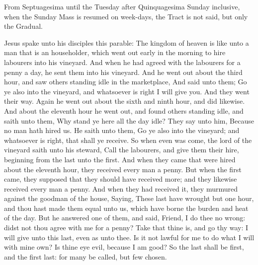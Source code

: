 \begin{rubric}
    From Septuagesima until the Tuesday after Quinquagesima Sunday inclusive, when the Sunday Mass is resumed on week-days, the Tract is not said, but only the Gradual.
\end{rubric}


 Jesus spake unto his disciples this parable: The kingdom of heaven is like unto a man that is an householder, which went out early in the morning to hire labourers into his vineyard. And when he had agreed with the labourers for a penny a day, he sent them into his vineyard. And he went out about the third hour, and saw others standing idle in the marketplace, And said unto them; Go ye also into the vineyard, and whatsoever is right I will give you. And they went their way. Again he went out about the sixth and ninth hour, and did likewise. And about the eleventh hour he went out, and found others standing idle, and saith unto them, Why stand ye here all the day idle? They say unto him, Because no man hath hired us. He saith unto them, Go ye also into the vineyard; and whatsoever is right, that shall ye receive. So when even was come, the lord of the vineyard saith unto his steward, Call the labourers, and give them their hire, beginning from the last unto the first. And when they came that were hired about the eleventh hour, they received every man a penny. But when the first came, they supposed that they should have received more; and they likewise received every man a penny. And when they had received it, they murmured against the goodman of the house, Saying, These last have wrought but one hour, and thou hast made them equal unto us, which have borne the burden and heat of the day. But he answered one of them, and said, Friend, I do thee no wrong: didst not thou agree with me for a penny? Take that thine is, and go thy way: I will give unto this last, even as unto thee. Is it not lawful for me to do what I will with mine own? Is thine eye evil, because I am good? So the last shall be first, and the first last: for many be called, but few chosen.



